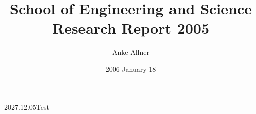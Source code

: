 \documentclass[11pt,a4paper,twoside,twocolumn]{article}
\begin{document}
\def\Hchapter{\paragraph}
\def\bpchem{\BPChem}   %
%
\graphicspath{{./MathTheoPhys/}{./Physics/}{./Nano/}{./LifeSciences/}{./GeoAstro/}{./EECS/}}

\title     {School of Engineering and Science \\
            Research Report 2005} 
\author    {Anke Allner}
\date      {2006 January 18}
   \version
{2}{0}{27.12.05}{Test}

\renewcommand{\refname}{\medbreak Publications\vadjust{\nobreak}}
\renewcommand{\bibname}{\medbreak Publications\vadjust{\nobreak}}
\end{document}
